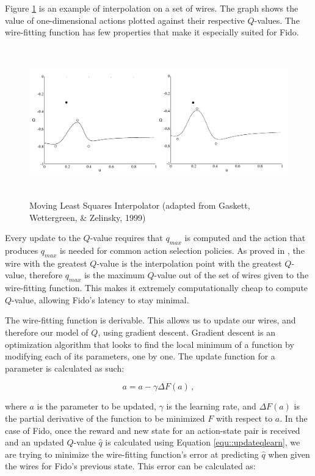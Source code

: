 Figure \ref{fig::wirefitexample} is an example of interpolation on a set of wires. The graph shows the value of one-dimensional actions plotted against their respective $Q$-values. The wire-fitting function has few properties that make it especially suited for Fido.

\begin{figure}[ht]
    \centering
    \includegraphics[height=6.5cm]{Figures/WireFit.png}
	\caption{Moving Least Squares Interpolator (adapted from Gaskett, Wettergreen, \& Zelinsky, 1999)}
    \label{fig::wirefitexample}
\end{figure}

Every update to the $Q$-value requires that $q_{max}$ is computed and the action that produces $q_{max}$ is needed for common action selection policies. As proved in \cite{baird}, the wire with the greatest $Q$-value is the interpolation point with the greatest $Q$-value, therefore $q_{max}$ is the maximum $Q$-value out of the set of wires given to the wire-fitting function. This makes it extremely computationally cheap to compute $Q$-value, allowing Fido's latency to stay minimal.

The wire-fitting function is derivable. This allows us to update our wires, and therefore our model of $Q$, using gradient descent. Gradient descent is an optimization algorithm that looks to find the local minimum of a function by modifying each of its parameters, one by one. The update function for a parameter is calculated as such:

\begin{equation}
	a = a - \gamma \Delta F(a)
	\,,
	\label{equ::wirefiterrorfunction}
\end{equation}

where $a$ is the parameter to be updated, $\gamma$ is the learning rate, and $\Delta F(a)$ is the partial derivative of the function to be minimized $F$ with respect to $a$. In the case of Fido, once the reward and new state for an action-state pair is received and an updated $Q$-value $\hat{q}$ is calculated using Equation \ref{equ::updateqlearn}, we are trying to minimize the wire-fitting function's error at predicting $\hat{q}$ when given the wires for Fido's previous state. This error can be calculated as:

